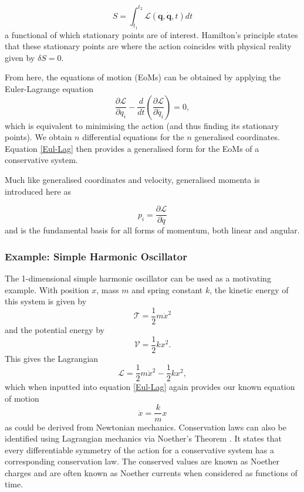 \documentclass[10pt]{iopart}
\begin{document}
\begin{equation}
		S = \int_{t_1}^{t_2} \mathcal{L}(\mathbf{q},\mathbf{\dot{q}},t) dt
\end{equation}
a functional of which stationary points are of interest. Hamilton's principle \cite{Goldstein} states that these stationary points are where the action coincides with physical reality given by $\delta S = 0$. 

From here, the equations of motion (EoMs) can be obtained by applying the Euler-Lagrange equation
\begin{equation}
\label{Eul-Lag}
	\frac{\partial\mathcal{L}}{\partial q_i} - \frac{d}{dt}\left(\frac{\partial \mathcal{L}}{\partial \dot{q_i}}\right) = 0,
\end{equation}
 which is equivalent to minimising the action (and thus finding its stationary points). We obtain $n$ differential equations for the $n$ generalised coordinates. Equation \ref{Eul-Lag} then provides a generalised form for the EoMs of a conservative system. 

Much like generalised coordinates and velocity, generalised momenta is introduced here as 

\begin{equation}
\label{GeneralisedMomenta}
	p_i = \frac{\partial \mathcal{L}}{\partial \dot q}
\end{equation}
and is the fundamental basis for all forms of momentum, both linear and angular.

\subsubsection{Example: Simple Harmonic Oscillator \\}

The 1-dimensional simple harmonic oscillator can be used as a motivating example. With position $x$, mass $m$ and spring constant $k$, the kinetic energy of this system is given by
\begin{equation}
	\mathcal T = \frac{1}{2}m\dot x^2
\end{equation}
and the potential energy by 
\begin{equation}
	\mathcal V = \frac{1}{2}kx^2.
\end{equation}
This gives the Lagrangian
\begin{equation}
	\mathcal{L} = \frac{1}{2}m\ddot x^2 - \frac{1}{2}kx^2,
\end{equation}
which when inputted into equation \ref{Eul-Lag} again provides our known equation of motion
\begin{equation}
\label{HOeqn}
	\ddot x = \frac{k}{m}x
\end{equation}
as could be derived from Newtonian mechanics.
Conservation laws can also be identified using Lagrangian mechanics via Noether's Theorem \cite{Goldstein}. It states that every differentiable symmetry of the action for a conservative system has a corresponding conservation law. The conserved values are known as Noether charges and are often known as Noether currents when considered as functions of time. 
\end{document}
